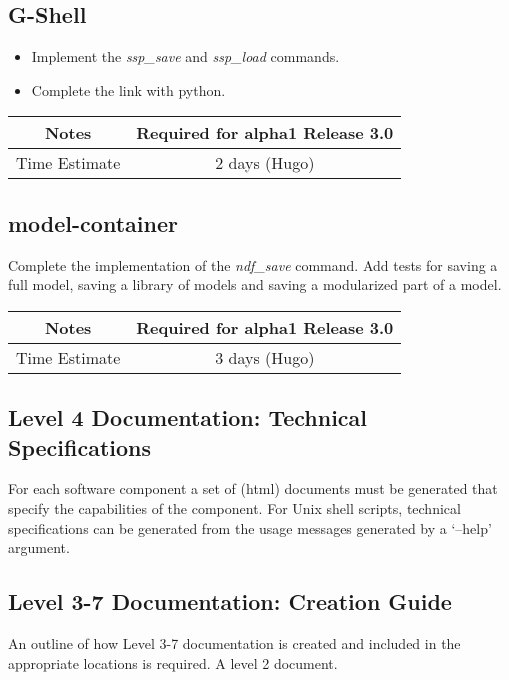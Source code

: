 \documentclass[12pt]{article}
\begin{document}
\subsection{G-Shell}
\begin{itemize}
\item Implement the {\it ssp\_save} and {\it ssp\_load} commands.
\item Complete the link with python.
\end{itemize}

{
  \vspace{5mm}
  \centering
  \begin{tabular}{|c|c|}
    \hline
    Notes
    & Required for alpha1 Release 3.0 \\
    \hline
    Time Estimate
    & 2 days (Hugo) \\
    \hline
  \end{tabular}
}


\subsection{model-container}
Complete the implementation of the {\it ndf\_save} command.  Add tests for
saving a full model, saving a library of models and saving a
modularized part of a model.

{
  \vspace{5mm}
  \centering
  \begin{tabular}{|c|c|}
    \hline
    Notes
    & Required for alpha1 Release 3.0 \\
    \hline
    Time Estimate
    & 3 days (Hugo) \\
    \hline
  \end{tabular}
}


\subsection{Level 4 Documentation: Technical Specifications}

For each software component a set of (html) documents must be
generated that specify the capabilities of the component.  For Unix
shell scripts, technical specifications can be generated from the
usage messages generated by a `--help' argument.


\subsection{Level 3-7 Documentation: Creation Guide}

An outline of how Level 3-7 documentation is created and included in
the appropriate locations is required.  A level 2 document.
\end{document}
